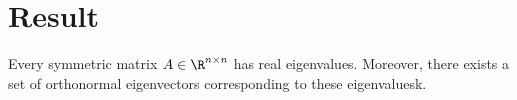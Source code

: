
\section*{Result}

Every symmetric matrix $A \in \R ^{n \times n}$ has real eigenvalues.
Moreover, there exists a set of orthonormal eigenvectors corresponding to these eigenvaluesk.

\blankpage
